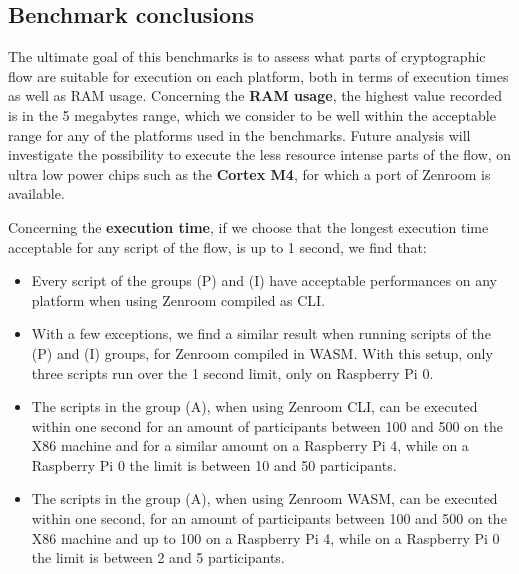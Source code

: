 \documentclass[twocolumn]{article}
\begin{document}
\subsection*{Benchmark conclusions} 

The ultimate goal of this benchmarks is to assess what parts of cryptographic flow are suitable for execution on each platform, both in terms of execution times as well as RAM usage. Concerning the \textbf{RAM usage}, the highest value recorded is in the 5 megabytes range, which we consider to be well within the acceptable range for any of the platforms used in the benchmarks. Future analysis will investigate the possibility to execute the less resource intense parts of the flow, on ultra low power chips such as the \textbf{Cortex M4}, for which a port of Zenroom is available.

Concerning the \textbf{execution time}, if we choose that the longest execution time acceptable for any script of the flow, is up to 1 second, we find that: 

\begin{itemize}
\item Every script of the groups (P) and (I) have acceptable performances on any platform when using Zenroom compiled as CLI. 

\item With a few exceptions, we find a similar result when running scripts of the  (P) and (I) groups, for Zenroom compiled in WASM. With this setup, only three scripts run over the 1 second limit, only on Raspberry Pi 0.
 
\item The scripts in the group (A), when using Zenroom CLI, can be executed within one second for an amount of participants between 100 and 500 on the X86 machine and for a similar amount on a Raspberry Pi 4, while on a Raspberry Pi 0 the limit is between 10 and 50 participants. 

\item The scripts in the group (A), when using Zenroom WASM, can be executed within one second, for an amount of participants between 100 and 500 on the X86 machine and up to 100 on a Raspberry Pi 4, while on a Raspberry Pi 0 the limit is between 2 and 5 participants. 

\end{itemize}



\end{document}
